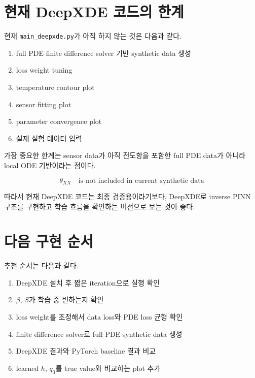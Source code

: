 \documentclass[11pt]{article}
\begin{document}
\section{현재 DeepXDE 코드의 한계}

현재 \texttt{main\_deepxde.py}가 아직 하지 않는 것은 다음과 같다.

\begin{enumerate}[leftmargin=2em]
\item full PDE finite difference solver 기반 synthetic data 생성
\item loss weight tuning
\item temperature contour plot
\item sensor fitting plot
\item parameter convergence plot
\item 실제 실험 데이터 입력
\end{enumerate}

가장 중요한 한계는 sensor data가 아직 전도항을 포함한 full PDE data가 아니라 local ODE 기반이라는 점이다.

\[
\theta_{XX} \quad \text{is not included in current synthetic data}
\]

따라서 현재 DeepXDE 코드는 최종 검증용이라기보다, DeepXDE로 inverse PINN 구조를 구현하고 학습 흐름을 확인하는 버전으로 보는 것이 좋다.

\section{다음 구현 순서}

추천 순서는 다음과 같다.

\begin{enumerate}[leftmargin=2em]
\item DeepXDE 설치 후 짧은 iteration으로 실행 확인
\item \(\beta\), \(S\)가 학습 중 변하는지 확인
\item loss weight를 조정해서 data loss와 PDE loss 균형 확인
\item finite difference solver로 full PDE synthetic data 생성
\item DeepXDE 결과와 PyTorch baseline 결과 비교
\item learned \(h\), \(q_0\)를 true value와 비교하는 plot 추가
\end{enumerate}
\end{document}
